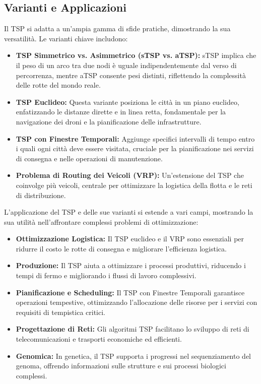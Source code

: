 \subsection{Varianti e Applicazioni}

Il \gls{TSP} si adatta a un'ampia gamma di sfide pratiche, dimostrando la sua versatilità. Le varianti chiave includono:

\begin{itemize}
	\item \textbf{TSP Simmetrico vs. Asimmetrico (sTSP vs. aTSP):} sTSP implica che il peso di un arco tra due nodi è uguale indipendentemente dal verso di percorrenza, mentre aTSP consente pesi distinti, riflettendo la complessità delle rotte del mondo reale.
	\item \textbf{TSP Euclideo:} Questa variante posiziona le città in un piano euclideo, enfatizzando le distanze dirette e in linea retta, fondamentale per la navigazione dei droni e la pianificazione delle infrastrutture.
	\item \textbf{TSP con Finestre Temporali:} Aggiunge specifici intervalli di tempo entro i quali ogni città deve essere visitata, cruciale per la pianificazione nei servizi di consegna e nelle operazioni di manutenzione.
	\item \textbf{Problema di Routing dei Veicoli (VRP):} Un'estensione del \gls{TSP} che coinvolge più veicoli, centrale per ottimizzare la logistica della flotta e le reti di distribuzione.
\end{itemize}

L'applicazione del \gls{TSP} e delle sue varianti si estende a vari campi, mostrando la sua utilità nell'affrontare complessi problemi di ottimizzazione:

\begin{itemize}
	\item \textbf{Ottimizzazione Logistica:} Il \gls{TSP} euclideo e il VRP sono essenziali per ridurre il costo  le rotte di consegna e migliorare l'efficienza logistica.
	\item \textbf{Produzione:} Il \gls{TSP} aiuta a ottimizzare i processi produttivi, riducendo i tempi di fermo e migliorando i flussi di lavoro complessivi.
	\item \textbf{Pianificazione e Scheduling:} Il \gls{TSP} con Finestre Temporali garantisce operazioni tempestive, ottimizzando l'allocazione delle risorse per i servizi con requisiti di tempistica critici.
	\item \textbf{Progettazione di Reti:} Gli algoritmi \gls{TSP} facilitano lo sviluppo di reti di telecomunicazioni e trasporti economiche ed efficienti.
	\item \textbf{Genomica:} In genetica, il \gls{TSP} supporta i progressi nel sequenziamento del genoma, offrendo informazioni sulle strutture e sui processi biologici complessi.
\end{itemize}

